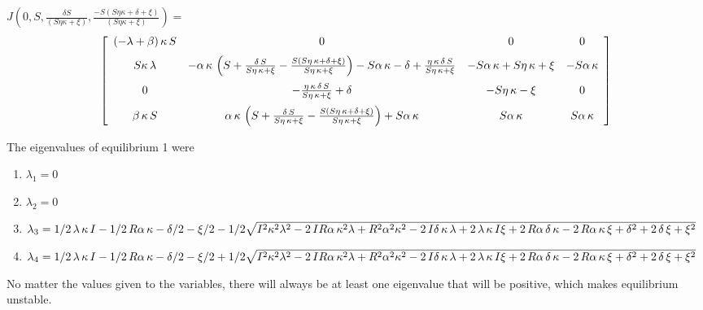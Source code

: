 \documentclass[11pt]{article}
\begin{document}
$J(0, S , \frac{\delta S}{(S\eta\kappa+\xi)}, \frac{-S(S\eta\kappa+\delta+\xi)}{(S\eta\kappa+\xi)}) =$
 \begin{equation*} %
 \left[ \begin {array}{cccc}  \left( -\lambda+\beta \right) \kappa\,S&0
&0&0\\ \noalign{\medskip}S\kappa\,\lambda&-\alpha\,\kappa\, \left( S+{
\frac {\delta\,S}{S\eta\,\kappa+\xi}}-{\frac {S \left( S\eta\,\kappa+
\delta+\xi \right) }{S\eta\,\kappa+\xi}} \right) -S\alpha\,\kappa-
\delta+{\frac {\eta\,\kappa\,\delta\,S}{S\eta\,\kappa+\xi}}&-S\alpha\,
\kappa+S\eta\,\kappa+\xi&-S\alpha\,\kappa\\ \noalign{\medskip}0&-{
\frac {\eta\,\kappa\,\delta\,S}{S\eta\,\kappa+\xi}}+\delta&-S\eta\,
\kappa-\xi&0\\ \noalign{\medskip}\beta\,\kappa\,S&\alpha\,\kappa\,
 \left( S+{\frac {\delta\,S}{S\eta\,\kappa+\xi}}-{\frac {S \left( S
\eta\,\kappa+\delta+\xi \right) }{S\eta\,\kappa+\xi}} \right) +S\alpha
\,\kappa&S\alpha\,\kappa&S\alpha\,\kappa\end {array} \right]
\end{equation*}

The eigenvalues of equilibrium 1 were
\begin{enumerate}
\item $\lambda_1 = 0$
\item $\lambda_2 = 0$
\item $\lambda_3 = 1/2\,\lambda\,\kappa\,I-1/2\,R\alpha\,\kappa-\delta/2-\xi/2-1/2\, \\
\sqrt {{I}^{2}{\kappa}^{2}{\lambda}^{2}-2\,IR\alpha\,{\kappa}^{2}
\lambda+{R}^{2}{\alpha}^{2}{\kappa}^{2}-2\,I\delta\,\kappa\,\lambda+2
\,\lambda\,\kappa\,I\xi+2\,R\alpha\,\delta\,\kappa-2\,R\alpha\,\kappa
\,\xi+{\delta}^{2}+2\,\delta\,\xi+{\xi}^{2}}$
\item $\lambda_4 = 1/2\,\lambda\,\kappa\,I-1/2\,R\alpha\,\kappa-\delta/2-\xi/2+1/2\, \\
\sqrt {{I}^{2}{\kappa}^{2}{\lambda}^{2}-2\,IR\alpha\,{\kappa}^{2}
\lambda+{R}^{2}{\alpha}^{2}{\kappa}^{2}-2\,I\delta\,\kappa\,\lambda+2
\,\lambda\,\kappa\,I\xi+2\,R\alpha\,\delta\,\kappa-2\,R\alpha\,\kappa
\,\xi+{\delta}^{2}+2\,\delta\,\xi+{\xi}^{2}}$
\end{enumerate}

No matter the values given to the variables, there will always be at least one eigenvalue that will be positive, which makes equilibrium unstable.
\end{document}

